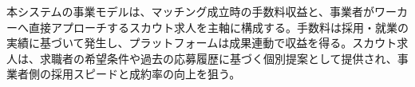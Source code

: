 本システムの事業モデルは、マッチング成立時の手数料収益と、事業者がワーカーへ直接アプローチするスカウト求人を主軸に構成する。手数料は採用・就業の実績に基づいて発生し、プラットフォームは成果連動で収益を得る。スカウト求人は、求職者の希望条件や過去の応募履歴に基づく個別提案として提供され、事業者側の採用スピードと成約率の向上を狙う。

\begin{figure}[htbp]
\centering
\label{fig:business}
\end{figure}